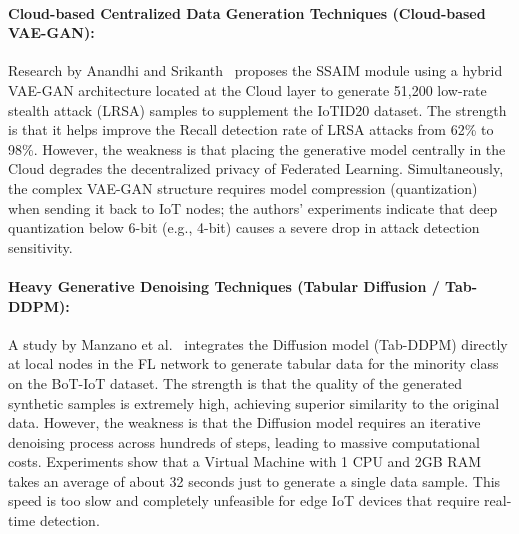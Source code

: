 \paragraph{Cloud-based Centralized Data Generation Techniques (Cloud-based VAE-GAN):}
Research by Anandhi and Srikanth~\cite{anandhi2026} proposes the SSAIM module using a hybrid VAE-GAN architecture located at the Cloud layer to generate 51,200 low-rate stealth attack (LRSA) samples to supplement the IoTID20 dataset. The strength is that it helps improve the Recall detection rate of LRSA attacks from 62\% to 98\%. However, the weakness is that placing the generative model centrally in the Cloud degrades the decentralized privacy of Federated Learning. Simultaneously, the complex VAE-GAN structure requires model compression (quantization) when sending it back to IoT nodes; the authors' experiments indicate that deep quantization below 6-bit (e.g., 4-bit) causes a severe drop in attack detection sensitivity.

\paragraph{Heavy Generative Denoising Techniques (Tabular Diffusion / Tab-DDPM):}
A study by Manzano et al.~\cite{manzano2025} integrates the Diffusion model (Tab-DDPM) directly at local nodes in the FL network to generate tabular data for the minority class on the BoT-IoT dataset. The strength is that the quality of the generated synthetic samples is extremely high, achieving superior similarity to the original data. However, the weakness is that the Diffusion model requires an iterative denoising process across hundreds of steps, leading to massive computational costs. Experiments show that a Virtual Machine with 1 CPU and 2GB RAM takes an average of about 32 seconds just to generate a single data sample. This speed is too slow and completely unfeasible for edge IoT devices that require real-time detection.

